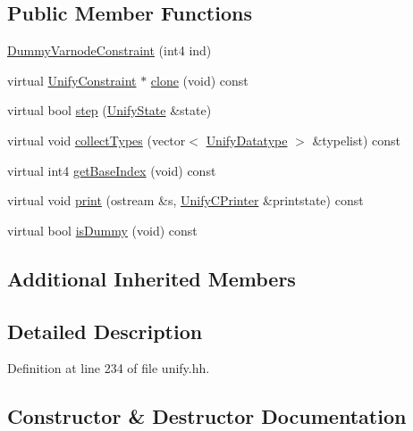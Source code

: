 \subsection*{Public Member Functions}
\begin{DoxyCompactItemize}
\item 
\mbox{\hyperlink{class_dummy_varnode_constraint_a3506beca3f9b27badaa0831446588ce9}{Dummy\+Varnode\+Constraint}} (int4 ind)
\item 
virtual \mbox{\hyperlink{class_unify_constraint}{Unify\+Constraint}} $\ast$ \mbox{\hyperlink{class_dummy_varnode_constraint_a8a5c0d0f00ab7343a19985465e59dc4b}{clone}} (void) const
\item 
virtual bool \mbox{\hyperlink{class_dummy_varnode_constraint_a70d9094ae099aa7f9259e2374ca1a8ed}{step}} (\mbox{\hyperlink{class_unify_state}{Unify\+State}} \&state)
\item 
virtual void \mbox{\hyperlink{class_dummy_varnode_constraint_a93602f80ea23d51b74250700aab3e991}{collect\+Types}} (vector$<$ \mbox{\hyperlink{class_unify_datatype}{Unify\+Datatype}} $>$ \&typelist) const
\item 
virtual int4 \mbox{\hyperlink{class_dummy_varnode_constraint_ae4492ac6a373dc86f3d92fc8ba314f70}{get\+Base\+Index}} (void) const
\item 
virtual void \mbox{\hyperlink{class_dummy_varnode_constraint_ab652913e2a7a3dc1ac3fc44f10807d5f}{print}} (ostream \&s, \mbox{\hyperlink{class_unify_c_printer}{Unify\+C\+Printer}} \&printstate) const
\item 
virtual bool \mbox{\hyperlink{class_dummy_varnode_constraint_adabb4d2a9cc6eaaed1c2d98e1eb054ad}{is\+Dummy}} (void) const
\end{DoxyCompactItemize}
\subsection*{Additional Inherited Members}


\subsection{Detailed Description}


Definition at line 234 of file unify.\+hh.



\subsection{Constructor \& Destructor Documentation}
\mbox{\label{class_dummy_varnode_constraint_a3506beca3f9b27badaa0831446588ce9}} 
